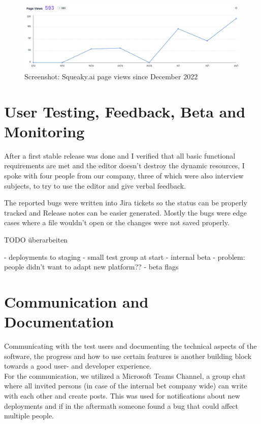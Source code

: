 \begin{figure}[h]
  \centering
  \includegraphics[width=\textwidth]{pics/squeaky_user_curve.jpg}
  \caption{Screenshot: Squeaky.ai page views since December 2022}
  \label{fig:squeaky_users}
\end{figure}

\section{User Testing, Feedback, Beta and Monitoring}

After a first stable release was done and I verified that all basic functional requirements are met and the editor doesn't destroy the dynamic resources,
I spoke with four people from our company, three of which were also interview subjects, to try to use the editor and give verbal feedback.

The reported bugs were written into Jira tickets so the status can be properly tracked and Release notes can be easier generated.
Mostly the bugs were edge cases where a file wouldn't open or the changes were not saved properly.

TODO überarbeiten

- deployments to staging
- small test group at start
- internal beta
 - problem: people didn't want to adapt new platform??
- beta flags

\section{Communication and Documentation}
Communicating with the test users and documenting the technical aspects of the software, the progress and how to use certain features is
another building block towards a good user- and developer experience.
\\
For the communication, we utilized a Microsoft Teams Channel, a group chat where all invited persons (in case of the internal bet company wide) can write with each other and create posts.
This was used for notifications about new deployments and if in the aftermath someone found a bug that could affect multiple people.

